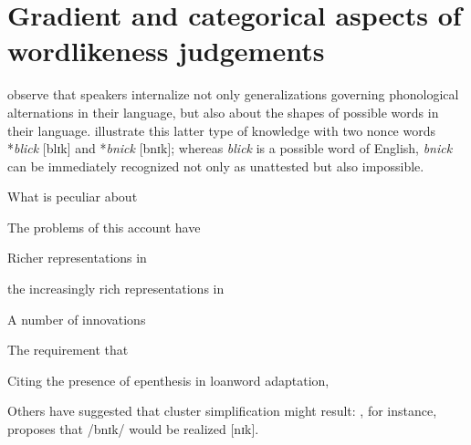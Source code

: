 \chapter{Gradient and categorical aspects of wordlikeness judgements}
\label{gradience}

\citet{Chomsky1965} observe that speakers internalize not only generalizations governing phonological alternations in their language, but also about the shapes of possible words in their language. \citeauthor{Chomsky1965} illustrate this latter type of knowledge with two nonce words *\emph{blick} [blɪk] and *\emph{bnick} [bnɪk]; whereas \emph{blick} is a possible word of English, \emph{bnick} can be immediately recognized not only as unattested but also impossible.

What is peculiar about 


The problems of this account have 

Richer representations in 

the increasingly rich representations in 

A number of innovations 

The requirement that 

Citing the presence of epenthesis in loanword adaptation, \citet{Hooper1973} 






Others have suggested that cluster simplification might result: \citet[][19f.]{Wolf2009}, for instance, proposes that /bnɪk/ would be realized [nɪk].

